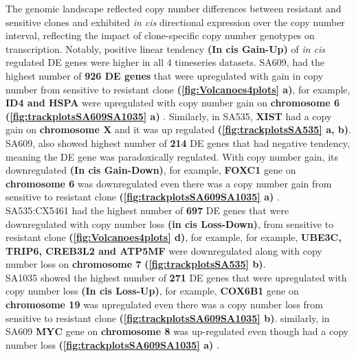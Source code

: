 The genomic landscape reflected copy number differences between resistant and sensitive clones and exhibited \textit{in cis} directional expression over the copy number interval, reflecting the impact of clone-specific copy number genotypes on transcription. 
Notably, positive linear tendency \textbf{(In cis Gain-Up)} of \textit{in cis} regulated DE genes were higher in all 4 timeseries datasets. SA609, had the highest number of \textbf{926 DE genes} that were upregulated with gain in copy number from sensitive to resistant clone \textbf{(\autoref{fig:Volcanoes4plots} a)}, for example, \textbf{ID4 and HSPA} were upregulated with copy number gain on \textbf{chromosome 6} \textbf{(\autoref{fig:trackplotsSA609SA1035} a) }. Similarly, in SA535, \textbf{XIST} had a copy gain on \textbf{chromosome X} and it was up regulated \textbf{(\autoref{fig:trackplotsSA535} a, b)}.
\\
SA609, also showed highest number of \textbf{214} DE genes that had negative tendency, meaning the DE gene was paradoxically regulated. With copy number gain, its downregulated \textbf{(In cis Gain-Down)}, for example, \textbf{FOXC1} gene on \textbf{chromosome 6} was downregulated even there was a copy number gain from sensitive to resistant clone \textbf{(\autoref{fig:trackplotsSA609SA1035} a) }.
\\
SA535:CX5461 had the highest number of \textbf{697} DE genes that were downregulated with copy number loss \textbf{(in cis Loss-Down)}, from sensitive to resistant clone \textbf{(\autoref{fig:Volcanoes4plots} d)}, for example, for example, \textbf{UBE3C, TRIP6, CREB3L2 and ATP5MF} were downregulated along with copy number loss on \textbf{chromosome 7} \textbf{(\autoref{fig:trackplotsSA535} b)}.
\\
SA1035 showed the highest number of \textbf{271} DE genes that were upregulated with copy number loss \textbf{(In cis Loss-Up)}, for example, \textbf{COX6B1} gene on \textbf{chromosome 19} was upregulated even there was a copy number loss from sensitive to resistant clone \textbf{(\autoref{fig:trackplotsSA609SA1035} b)}. similarly, in SA609 \textbf{MYC} gene on \textbf{chromosome 8} was up-regulated even though had a copy number loss \textbf{(\autoref{fig:trackplotsSA609SA1035} a) }.


